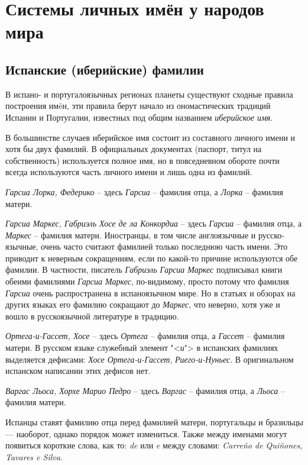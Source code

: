 \chapter{Системы личных имён у народов мира}

\section{Испанские (иберийские) фамилии}

В испано- и португалоязычных регионах планеты существуют сходные правила построения им\"eн, эти правила берут начало из ономастических традиций Испании и Португалии, известных под общим названием \emph{иберийское имя}.

В большинстве случаев иберийское имя состоит из составного личного имени и хотя бы двух фамилий. В официальных документах (паспорт, титул на собственность) используется полное имя, но в повседневном обороте почти всегда используются часть личного имени и лишь одна из фамилий.

\emph{Гарсиа Лорка, Федерико} -- здесь \emph{Гарсиа} -- фамилия отца, а \emph{Лорка} -- фамилия матери.

\emph{Гарсиа Маркес, Габриэль Хосе де ла Конкордиа} -- здесь \emph{Гарсиа} -- фамилия отца, а \emph{Маркес} -- фамилия матери. Иностранцы, в том числе англоязычные и русско-язычные, очень часто считают фамилией только последнюю часть имени. Это приводит к неверным сокращениям, если по какой-то причине используются обе фамилии. В частности, писатель \emph{Габриэль Гарсиа Маркес} подписывал книги обеими фамилиями \emph{Гарсиа Маркес}, по-видимому, просто потому что фамилия \emph{Гарсиа} очень распространена в испаноязычном мире. Но в статьях и обзорах на других языках его фамилию сокращают до \emph{Маркес}, что неверно, хотя уже и вошло в русскоязычной литературе в традицию.

\emph{Ортега-и-Гассет, Хосе} -- здесь \emph{Ортега} -- фамилия отца, а \emph{Гассет} -- фамилия матери. В русском языке служебный элемент "<\emph{и}"> в испанских фамилиях выделяется дефисами: \emph{Хосе Ортега-и-Гассет}, \emph{Риего-и-Нуньес}. В оригинальном испанском написании этих дефисов нет.

\emph{Варгас Льоса, Хорхе Марио Педро} -- здесь \emph{Варгас} -- фамилия отца, а \emph{Льоса} -- фамилия матери.

Испанцы ставят фамилию отца перед фамилией матери, португальцы и бразильцы — наоборот, однако порядок может измениться. Также между именами могут появиться короткие слова, как то: \emph{de} или \emph{e} между словами: \emph{Carre\~no de Qui\~nones}, \emph{Tavares e Silva}.

